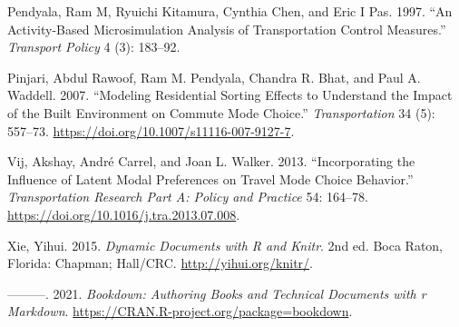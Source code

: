 \documentclass[12pt, oneside, openright]{byuthesis}
\newlength{\cslhangindent}
\newlength{\cslentryspacingunit} %
\newenvironment{CSLReferences}[2] %
 {%
  \setlength{\parindent}{0pt}
  \ifodd #1
  \let\oldpar\par
  \def\par{\hangindent=\cslhangindent\oldpar}
  \fi
  \setlength{\parskip}{#2\cslentryspacingunit}
 }%
 {}
\begin{document}
\begin{CSLReferences}{1}{0}
\leavevmode{}%
Pendyala, Ram M, Ryuichi Kitamura, Cynthia Chen, and Eric I Pas. 1997. {``An Activity-Based Microsimulation Analysis of Transportation Control Measures.''} \emph{Transport Policy} 4 (3): 183--92.

\leavevmode{}%
Pinjari, Abdul Rawoof, Ram M. Pendyala, Chandra R. Bhat, and Paul A. Waddell. 2007. {``Modeling Residential Sorting Effects to Understand the Impact of the Built Environment on Commute Mode Choice.''} \emph{Transportation} 34 (5): 557--73. \url{https://doi.org/10.1007/s11116-007-9127-7}.

\leavevmode{}%
Vij, Akshay, André Carrel, and Joan L. Walker. 2013. {``Incorporating the Influence of Latent Modal Preferences on Travel Mode Choice Behavior.''} \emph{Transportation Research Part A: Policy and Practice} 54: 164--78. \url{https://doi.org/10.1016/j.tra.2013.07.008}.

\leavevmode{}%
Xie, Yihui. 2015. \emph{Dynamic Documents with {R} and Knitr}. 2nd ed. Boca Raton, Florida: Chapman; Hall/CRC. \url{http://yihui.org/knitr/}.

\leavevmode{}%
---------. 2021. \emph{Bookdown: Authoring Books and Technical Documents with r Markdown}. \url{https://CRAN.R-project.org/package=bookdown}.

\end{CSLReferences}


\end{document}
